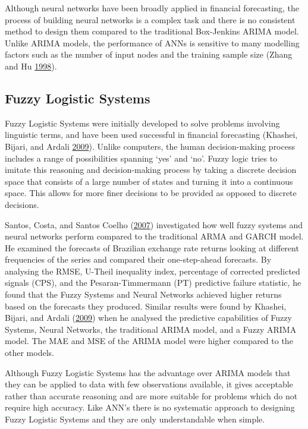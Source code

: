 \documentclass[12pt,preprint, authoryear]{elsarticle}
\numberwithin{equation}{section}
\numberwithin{figure}{section}
\numberwithin{table}{section}
\begin{document}
Although neural networks have been broadly applied in financial
forecasting, the process of building neural networks is a complex task
and there is no consistent method to design them compared to the
traditional Box-Jenkins ARIMA model. Unlike ARIMA models, the
performance of ANNs is sensitive to many modelling factors such as the
number of input nodes and the training sample size (Zhang and Hu
\protect\hyperlink{ref-zhang1998}{1998}).

\subsection{Fuzzy Logistic Systems}\label{fuzzy-logistic-systems}

Fuzzy Logistic Systems were initially developed to solve problems
involving linguistic terms, and have been used successful in financial
forecasting (Khashei, Bijari, and Ardali
\protect\hyperlink{ref-khashei2009}{2009}). Unlike computers, the human
decision-making process includes a range of possibilities spanning `yes'
and `no'. Fuzzy logic tries to imitate this reasoning and
decision-making process by taking a discrete decision space that
consists of a large number of states and turning it into a continuous
space. This allows for more finer decisions to be provided as opposed to
discrete decisions.

Santos, Costa, and Santos Coelho
(\protect\hyperlink{ref-santos2007}{2007}) investigated how well fuzzy
systems and neural networks perform compared to the traditional ARMA and
GARCH model. He examined the forecasts of Brazilian exchange rate
returns looking at different frequencies of the series and compared
their one-step-ahead forecasts. By analysing the RMSE, U-Theil
inequality index, percentage of corrected predicted signals (CPS), and
the Pesaran-Timmermann (PT) predictive failure statistic, he found that
the Fuzzy Systems and Neural Networks achieved higher returns based on
the forecasts they produced. Similar results were found by Khashei,
Bijari, and Ardali (\protect\hyperlink{ref-khashei2009}{2009}) when he
analysed the predictive capabilities of Fuzzy Systems, Neural Networks,
the traditional ARIMA model, and a Fuzzy ARIMA model. The MAE and MSE of
the ARIMA model were higher compared to the other models.

Although Fuzzy Logistic Systems has the advantage over ARIMA models that
they can be applied to data with few observations available, it gives
acceptable rather than accurate reasoning and are more suitable for
problems which do not require high accuracy. Like ANN's there is no
systematic approach to designing Fuzzy Logistic Systems and they are
only understandable when simple.
\end{document}
